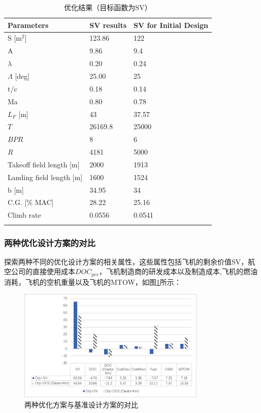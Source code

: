 \documentclass[12pt,a4paper]{report}
\begin{document}
\begin{table}
\centering
\caption{优化结果（目标函数为SV）}
\small
\begin{tabular}{|p{4.5cm}|p{2.8cm}|p{4cm}|}
\hhline{|===|}
Parameters	& SV results &	 SV for Initial Design \\ \hline
S [m$^2$]	& 123.86	& 122 \\ \hline
A	& 9.86	& 9.4 \\ \hline
$\lambda$	& 0.20	& 0.24 \\ \hline
$\Lambda$ [deg]	 &25.00	 & 25\\ \hline
t/c	 & 0.18	 & 0.14\\ \hline
Ma	& 0.80	& 0.78\\ \hline
$L_F$ [m] & 43	& 37.57 \\ \hline
$T$  & 26169.8	& 25000 \\ \hline
$BPR$ & 8  &  6 \\ \hline
$R$  & 4181	&  5000 \\ \hline
Takeoff field length [m]	& 2000	&1913\\ \hline
Landing field length [m]	& 1600	& 1524\\ \hline
b [m]	& 34.95	& 34\\ \hline
C.G. [\% MAC]	& 28.22 & 25.16\\ \hline
Climb rate	& 0.0556	& 0.0541 \\ \hhline{|===|}
\end{tabular}
\label{aircraft-results-sv}
\end{table}

\subsubsection{两种优化设计方案的对比}
探索两种不同的优化设计方案的相关属性，这些属性包括飞机的剩余价值SV，航空公司的直接使用成本$DO{{C}_{per}}$，飞机制造商的研发成本以及制造成本,飞机的燃油消耗，飞机的空机重量以及飞机的MTOW，如图\ref{fig:aircraft-doc-sv}所示：

\begin{figure}[ht!]
  \centering
  \includegraphics[width=0.8\textwidth]{./media4/aircraft-doc-sv.png}
  \caption{两种优化方案与基准设计方案的对比}
  \label{fig:aircraft-doc-sv}
\end{figure}
\end{document}
